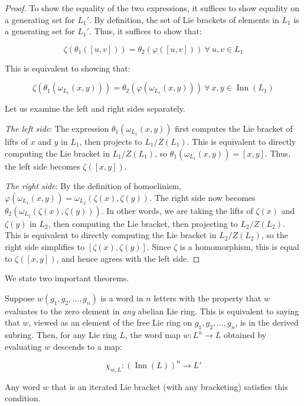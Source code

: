\begin{proof}
  To show the equality of the two expressions, it suffices to show
  equality on a generating set for $L_1'$. By definition, the set of
  Lie brackets of elements in $L_1$ is a generating set for
  $L_1'$. Thus, it suffices to show that:

  $$\zeta(\theta_1([u,v])) = \theta_2(\varphi([u,v])) \ \forall \ u,v \in L_1$$

  This is equivalent to showing that:

  $$\zeta(\theta_1(\omega_{L_1}(x,y))) = \theta_2(\varphi(\omega_{L_1}(x,y))) \ \forall \ x,y \in \operatorname{Inn}(L_1)$$

  Let us examine the left and right sides separately. 

  {\em The left side}: The expression $\theta_1(\omega_{L_1}(x,y))$
  first computes the Lie bracket of lifts of $x$ and $y$ in $L_1$, then
  projects to $L_1/Z(L_1)$. This is equivalent to directly computing
  the Lie bracket in $L_1/Z(L_1)$, so $\theta_1(\omega_{L_1}(x,y)) =
  [x,y]$. Thus, the left side becomes $\zeta([x,y])$.

  {\em The right side}: By the definition of homoclinism,
  $\varphi(\omega_{L_1}(x,y)) = \omega_{L_2}(\zeta(x),\zeta(y))$. The
  right side now becomes
  $\theta_2(\omega_{L_2}(\zeta(x),\zeta(y)))$. In other words, we are
  taking the lifts of $\zeta(x)$ and $\zeta(y)$ in $L_2$, then
  computing the Lie bracket, then projecting to $L_2/Z(L_2)$. This is
  equivalent to directly computing the Lie bracket in $L_2/Z(L_2)$, so
  the right side simplifies to $[\zeta(x),\zeta(y)]$. Since $\zeta$ is
  a homomorphism, this is equal to $\zeta([x,y])$, and hence agrees
  with the left side.
\end{proof}

We state two important theorems.

\begin{theorem}\label{thm:iterated-bracket-descends-to-inn}
  Suppose $w(g_1,g_2,\dots,g_n)$ is a word in $n$ letters with the
  property that $w$ evaluates to the zero element in {\em any}
  abelian Lie ring. This is equivalent to saying that $w$, viewed as an
  element of the free Lie ring on $g_1,g_2,\dots,g_n$, is in the derived
  subring. Then, for any Lie ring $L$, the word map $w:L^n \to L$ obtained
  by evaluating $w$ descends to a map:

  $$\chi_{w,L}: (\operatorname{Inn}(L))^n  \to L'$$

  Any word $w$ that is an iterated Lie bracket (with any bracketing)
  satisfies this condition.
\end{theorem}


